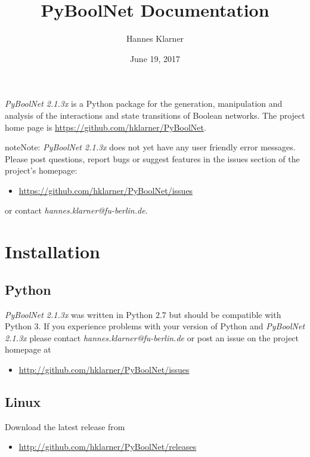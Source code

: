 \documentclass[letterpaper,10pt,english]{sphinxmanual}
\title{PyBoolNet Documentation}
\date{June 19, 2017}
\author{Hannes Klarner}
\begin{document}
\maketitle
\tableofcontents
{}\label{index::doc}
\emph{PyBoolNet 2.1.3x} is a Python package for the generation, manipulation and analysis of the interactions and state transitions of Boolean networks.
The project home page is \href{https://github.com/hklarner/PyBoolNet}{https://github.com/hklarner/PyBoolNet}.

\begin{notice}{note}{Note:}
\emph{PyBoolNet 2.1.3x} does not yet have any user friendly error messages.
Please post questions, report bugs or suggest features in the issues section of the project's homepage:
\begin{itemize}
\item {} 
\href{https://github.com/hklarner/PyBoolNet/issues}{https://github.com/hklarner/PyBoolNet/issues}

\end{itemize}

or contact \emph{hannes.klarner@fu-berlin.de}.
\end{notice}




\chapter{Installation}
\label{Installation:installation}\label{Installation:id1}\label{Installation::doc}\label{Installation:installation-software}

\section{Python}
\label{Installation:python}
\emph{PyBoolNet 2.1.3x} was written in Python 2.7 but should be compatible with Python 3.
If you experience problems with your version of Python and \emph{PyBoolNet 2.1.3x} please contact \emph{hannes.klarner@fu-berlin.de} or
post an issue on the project homepage at
\begin{itemize}
\item {} 
\href{http://github.com/hklarner/PyBoolNet/issues}{http://github.com/hklarner/PyBoolNet/issues}

\end{itemize}


\section{Linux}
\label{Installation:linux}
Download the latest release from
\begin{itemize}
\item {} 
\href{http://github.com/hklarner/PyBoolNet/releases}{http://github.com/hklarner/PyBoolNet/releases}

\end{itemize}
\end{document}
